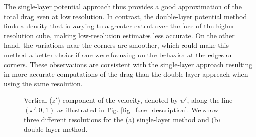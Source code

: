  The single-layer potential approach thus provides a good approximation of the total drag even at low resolution. In contrast, the double-layer potential method finds a density that is varying to a greater extent over the face of the higher-resolution cube, making low-resolution estimates less accurate. On the other hand, the variations near the corners are smoother, which could make this method a better choice if one were focusing on the behavior at the edges or corners.  These observations are consistent with the single-layer approach resulting in more accurate computations of the drag than the double-layer approach when using the same resolution.
 \par
 \begin{figure}[ht]
	\begin{center}
		\hspace{0.1cm}
	\end{center}
	\caption{Vertical ($z'$) component of the velocity, denoted by $w'$, along the line $(x',0,1)$ as illustrated in Fig. \ref{fig_face_description}.  We show three different resolutions for the (a) single-layer method and (b)  double-layer method.}
	\label{fig_cross_section}
\end{figure}

